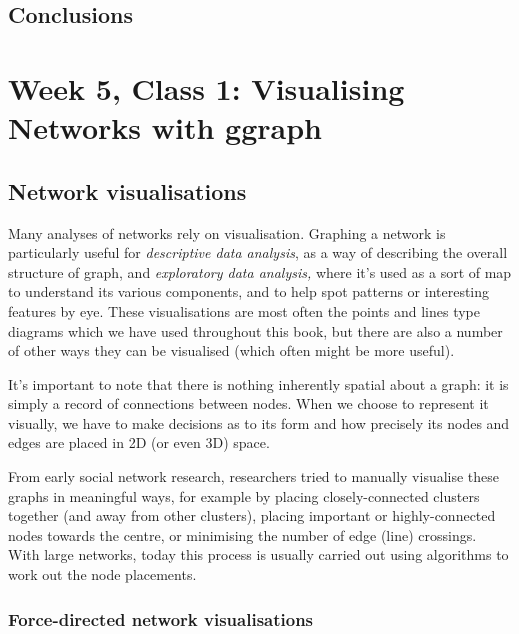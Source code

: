 \documentclass[
]{book}
\begin{document}
\hypertarget{conclusions-1}{%
\section{Conclusions}\label{conclusions-1}}

\hypertarget{week-5-class-1-visualising-networks-with-ggraph}{%
\chapter{Week 5, Class 1: Visualising Networks with ggraph}\label{week-5-class-1-visualising-networks-with-ggraph}}

\hypertarget{network-visualisations}{%
\section{Network visualisations}\label{network-visualisations}}

Many analyses of networks rely on visualisation. Graphing a network is particularly useful for \emph{descriptive data analysis}, as a way of describing the overall structure of graph, and \emph{exploratory data analysis,} where it's used as a sort of map to understand its various components, and to help spot patterns or interesting features by eye. These visualisations are most often the points and lines type diagrams which we have used throughout this book, but there are also a number of other ways they can be visualised (which often might be more useful).

It's important to note that there is nothing inherently spatial about a graph: it is simply a record of connections between nodes. When we choose to represent it visually, we have to make decisions as to its form and how precisely its nodes and edges are placed in 2D (or even 3D) space.

From early social network research, researchers tried to manually visualise these graphs in meaningful ways, for example by placing closely-connected clusters together (and away from other clusters), placing important or highly-connected nodes towards the centre, or minimising the number of edge (line) crossings. With large networks, today this process is usually carried out using algorithms to work out the node placements.

\hypertarget{force-directed-network-visualisations}{%
\subsection{Force-directed network visualisations}\label{force-directed-network-visualisations}}
\end{document}
